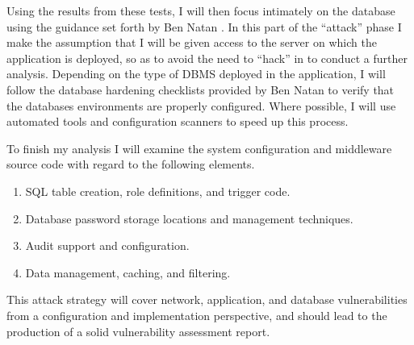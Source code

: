\documentclass{sig-alternate}
\begin{document}
Using the results from these tests, I will then focus intimately on the database using the guidance set forth by 
Ben Natan \cite{ben2005-SDS}. In this part of the ``attack'' phase I make the assumption that I will be given access to the 
server on which the application is deployed, so as to avoid the need to ``hack'' in to conduct a further analysis. 
Depending on the type of DBMS deployed in the application, I will follow the database hardening checklists 
provided by Ben Natan to verify that the databases environments are properly configured. Where possible, I will
use automated tools and configuration scanners to speed up this process.

To finish my analysis I will examine the system configuration and middleware source code with regard to the 
following elements.

\begin{enumerate}
	\item SQL table creation, role definitions, and trigger code.
	\item Database password storage locations and management techniques.
	\item Audit support and configuration.
	\item Data management, caching, and filtering.
\end{enumerate}

This attack strategy will cover network, application, and database vulnerabilities from a configuration
and implementation perspective, and should lead to the production of a solid vulnerability assessment report. 

\balance
\end{document}
